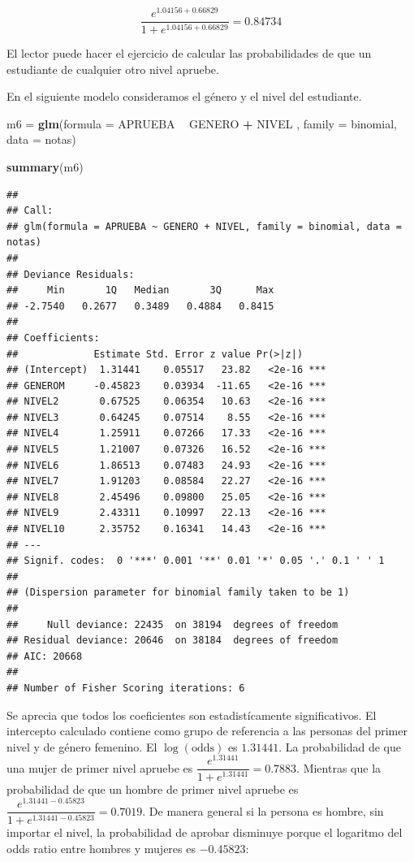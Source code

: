 \documentclass[
]{krantz}
\makeatletter
\newenvironment{Shaded}{\begin{snugshade}}{\end{snugshade}}
\newcommand{\DataTypeTok}[1]{\textcolor[rgb]{0.27,0.27,0.27}{#1}}
\newcommand{\KeywordTok}[1]{\textcolor[rgb]{0.27,0.27,0.27}{\textbf{#1}}}
\newcommand{\NormalTok}[1]{#1}
\newcommand{\OperatorTok}[1]{\textcolor[rgb]{0.43,0.43,0.43}{\textbf{#1}}}
\newcommand{\StringTok}[1]{\textcolor[rgb]{0.5,0.5,0.5}{#1}}
\newenvironment{kframe}{%
\medskip{}
\setlength{\fboxsep}{.8em}
 \def\at@end@of@kframe{}%
 \ifinner\ifhmode%
  \def\at@end@of@kframe{\end{minipage}}%
  \begin{minipage}{\columnwidth}%
 \fi\fi%
 \def\FrameCommand##1{\hskip\@totalleftmargin \hskip-\fboxsep
 \colorbox{shadecolor}{##1}\hskip-\fboxsep
     \hskip-\linewidth \hskip-\@totalleftmargin \hskip\columnwidth}%
 \MakeFramed {\advance\hsize-\width
   \@totalleftmargin\z@ \linewidth\hsize
   \@setminipage}}%
 {\par\unskip\endMakeFramed%
 \at@end@of@kframe}
\renewenvironment{Shaded}{\begin{kframe}}{\end{kframe}}
\makeatother
\begin{document}
\[\dfrac{e^{1.04156+0.66829}}{1+e^{1.04156+0.66829}}=0.84734\]

El lector puede hacer el ejercicio de calcular las probabilidades de que un estudiante de cualquier otro nivel apruebe.

En el siguiente modelo consideramos el género y el nivel del estudiante.

\begin{Shaded}
\begin{Highlighting}[]
\NormalTok{m6 =}\StringTok{ }\KeywordTok{glm}\NormalTok{(}\DataTypeTok{formula =}\NormalTok{ APRUEBA }\OperatorTok{~}\StringTok{ }\NormalTok{GENERO }\OperatorTok{+}\StringTok{ }\NormalTok{NIVEL , }\DataTypeTok{family =}\NormalTok{ binomial, }\DataTypeTok{data =}\NormalTok{ notas)}

\KeywordTok{summary}\NormalTok{(m6)}
\end{Highlighting}
\end{Shaded}

\begin{verbatim}
## 
## Call:
## glm(formula = APRUEBA ~ GENERO + NIVEL, family = binomial, data = notas)
## 
## Deviance Residuals: 
##     Min       1Q   Median       3Q      Max  
## -2.7540   0.2677   0.3489   0.4884   0.8415  
## 
## Coefficients:
##             Estimate Std. Error z value Pr(>|z|)    
## (Intercept)  1.31441    0.05517   23.82   <2e-16 ***
## GENEROM     -0.45823    0.03934  -11.65   <2e-16 ***
## NIVEL2       0.67525    0.06354   10.63   <2e-16 ***
## NIVEL3       0.64245    0.07514    8.55   <2e-16 ***
## NIVEL4       1.25911    0.07266   17.33   <2e-16 ***
## NIVEL5       1.21007    0.07326   16.52   <2e-16 ***
## NIVEL6       1.86513    0.07483   24.93   <2e-16 ***
## NIVEL7       1.91203    0.08584   22.27   <2e-16 ***
## NIVEL8       2.45496    0.09800   25.05   <2e-16 ***
## NIVEL9       2.43311    0.10997   22.13   <2e-16 ***
## NIVEL10      2.35752    0.16341   14.43   <2e-16 ***
## ---
## Signif. codes:  0 '***' 0.001 '**' 0.01 '*' 0.05 '.' 0.1 ' ' 1
## 
## (Dispersion parameter for binomial family taken to be 1)
## 
##     Null deviance: 22435  on 38194  degrees of freedom
## Residual deviance: 20646  on 38184  degrees of freedom
## AIC: 20668
## 
## Number of Fisher Scoring iterations: 6
\end{verbatim}

Se aprecia que todos los coeficientes son estadistícamente significativos. El intercepto calculado contiene como grupo de referencia a las personas del primer nivel y de género femenino. El \(\log \left( \text{odds} \right)\) es \(1.31441\). La probabilidad de que una mujer de primer nivel apruebe es \(\dfrac{e^{1.31441}}{1+e^{1.31441}}= 0.7883\). Mientras que la probabilidad de que un hombre de primer nivel apruebe es \(\dfrac{e^{1.31441-0.45823}}{1+e^{1.31441-0.45823}}= 0.7019\). De manera general si la persona es hombre, sin importar el nivel, la probabilidad de aprobar disminuye porque el logaritmo del odds ratio entre hombres y mujeres es \(-0.45823\):
\end{document}
